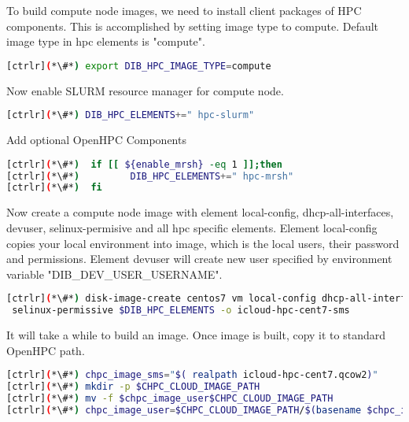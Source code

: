 To build compute node images, we need to install client packages of HPC components. This is accomplished by setting image type to compute. Default image type in hpc elements is "compute".

\begin{lstlisting}[language=bash,keywords={}]
[ctrlr](*\#*) export DIB_HPC_IMAGE_TYPE=compute
\end{lstlisting}

Now enable SLURM resource manager for compute node.

\begin{lstlisting}[language=bash,keywords={}]
[ctrlr](*\#*) DIB_HPC_ELEMENTS+=" hpc-slurm"
\end{lstlisting}

Add optional OpenHPC Components

\begin{lstlisting}[language=bash,keywords={}]
[ctrlr](*\#*)  if [[ ${enable_mrsh} -eq 1 ]];then
[ctrlr](*\#*)         DIB_HPC_ELEMENTS+=" hpc-mrsh"
[ctrlr](*\#*)  fi
\end{lstlisting}

Now create a compute node image with element local-config, dhcp-all-interfaces, devuser, selinux-permisive and all hpc specific elements. Element local-config copies your local environment into image, which is the local users, their password and permissions. Element devuser will create new user specified by environment variable "DIB\_DEV\_USER\_USERNAME". 

\begin{lstlisting}[language=bash,keywords={}]
[ctrlr](*\#*) disk-image-create centos7 vm local-config dhcp-all-interfaces devuser \
 selinux-permissive $DIB_HPC_ELEMENTS -o icloud-hpc-cent7-sms
\end{lstlisting}

It will take a while to build an image. Once image is built, copy it to standard OpenHPC path.

\begin{lstlisting}[language=bash,keywords={}]
[ctrlr](*\#*) chpc_image_sms="$( realpath icloud-hpc-cent7.qcow2)"
[ctrlr](*\#*) mkdir -p $CHPC_CLOUD_IMAGE_PATH
[ctrlr](*\#*) mv -f $chpc_image_user$CHPC_CLOUD_IMAGE_PATH
[ctrlr](*\#*) chpc_image_user=$CHPC_CLOUD_IMAGE_PATH/$(basename $chpc_image_sms)
\end{lstlisting}

